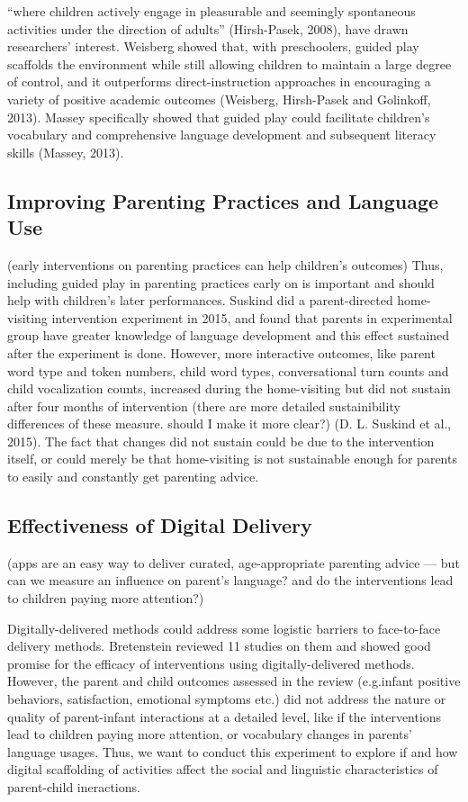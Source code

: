 \documentclass[10pt, letterpaper]{article}
\begin{document}
``where children actively engage in pleasurable and seemingly
spontaneous activities under the direction of adults'' (Hirsh-Pasek,
2008), have drawn researchers' interest. Weisberg showed that, with
preschoolers, guided play scaffolds the environment while still allowing
children to maintain a large degree of control, and it outperforms
direct-instruction approaches in encouraging a variety of positive
academic outcomes (Weisberg, Hirsh-Pasek and Golinkoff, 2013). Massey
specifically showed that guided play could facilitate children's
vocabulary and comprehensive language development and subsequent
literacy skills (Massey, 2013).

\subsection{Improving Parenting Practices and Language
Use}\label{improving-parenting-practices-and-language-use}

(early interventions on parenting practices can help children's
outcomes) Thus, including guided play in parenting practices early on is
important and should help with children's later performances. Suskind
did a parent-directed home-visiting intervention experiment in 2015, and
found that parents in experimental group have greater knowledge of
language development and this effect sustained after the experiment is
done. However, more interactive outcomes, like parent word type and
token numbers, child word types, conversational turn counts and child
vocalization counts, increased during the home-visiting but did not
sustain after four months of intervention (there are more detailed
sustainibility differences of these measure. should I make it more
clear?) (D. L. Suskind et al., 2015). The fact that changes did not
sustain could be due to the intervention itself, or could merely be that
home-visiting is not sustainable enough for parents to easily and
constantly get parenting advice.

\subsection{Effectiveness of Digital
Delivery}\label{effectiveness-of-digital-delivery}

(apps are an easy way to deliver curated, age-appropriate parenting
advice --- but can we measure an influence on parent's language? and do
the interventions lead to children paying more attention?)

Digitally-delivered methods could address some logistic barriers to
face-to-face delivery methods. Bretenstein reviewed 11 studies on them
and showed good promise for the efficacy of interventions using
digitally-delivered methods. However, the parent and child outcomes
assessed in the review (e.g.infant positive behaviors, satisfaction,
emotional symptoms etc.) did not address the nature or quality of
parent-infant interactions at a detailed level, like if the
interventions lead to children paying more attention, or vocabulary
changes in parents' language usages. Thus, we want to conduct this
experiment to explore if and how digital scaffolding of activities
affect the social and linguistic characteristics of parent-child
ineractions.
\end{document}
